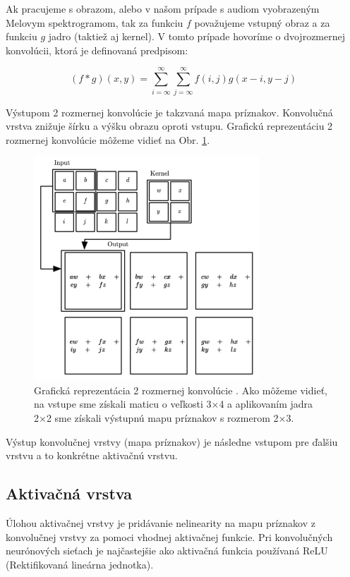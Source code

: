 Ak pracujeme s obrazom, alebo v našom prípade s audiom vyobrazeným Melovym spektrogramom, tak za funkciu $f$ považujeme vstupný obraz a za funkciu $g$ jadro (taktiež aj kernel). V tomto prípade hovoríme o dvojrozmernej konvolúcii, ktorá
je definovaná predpisom:

\begin{equation}
(f * g)(x, y) = \sum_{i=\infty}^{\infty} \sum_{j=\infty}^{\infty} f(i, j)g(x - i, y - j)
\end{equation}

Výstupom 2 rozmernej konvolúcie je takzvaná mapa príznakov. Konvolučná vrstva znižuje šírku a výšku obrazu oproti vstupu. Grafickú reprezentáciu 2 rozmernej konvolúcie môžeme vidieť na Obr. \ref{fig:2d_konvolucia}.

\begin{figure}[H]
\centerline{\includegraphics[width=0.75\textwidth]{images/konvolucia.png}}
\caption{Grafická reprezentácia 2 rozmernej konvolúcie \cite{convnn}. Ako môžeme vidieť, na vstupe
sme získali maticu o veľkosti 3×4 a aplikovaním jadra 2×2 sme získali výstupnú mapu
príznakov s rozmerom 2×3.}
\label{fig:2d_konvolucia}
\end{figure}

Výstup konvolučnej vrstvy (mapa príznakov) je následne vstupom pre ďalšiu vrstvu a
to konkrétne aktivačnú vrstvu.

\subsection{Aktivačná vrstva}

Úlohou aktivačnej vrstvy je pridávanie nelinearity na mapu príznakov
z konvolučnej vrstvy za pomoci vhodnej aktivačnej funkcie. Pri konvolučných neurónových sieťach je najčastejšie ako aktivačná funkcia používaná ReLU (Rektifikovaná lineárna jednotka).

